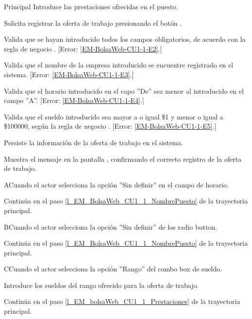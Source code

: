 \begin{UCtrayectoria}{Principal}
		\UCpaso [\UCactor] Introduce las prestaciones ofrecidas en el puesto. \label{l_EM_bolsaWeb_CU1_1_Prestaciones}
 
		\UCpaso [\UCactor] Solicita registrar la oferta de trabajo presionando el botón .

		\UCpaso Valida que se hayan introducido todos los campos obligatorios, de acuerdo con la regla de negocio . [Error: \ref{EM-BolsaWeb-CU1-1-E2}.]

		\UCpaso Valida que el nombre de la empresa introducido se encuentre registrado en el sistema. [Error: \ref{EM-BolsaWeb-CU1-1-E3}.]

		\UCpaso Valida que el horario introducido en el capo ''De'' sea menor al introducido en el campo ''A''. [Error: \ref{EM-BolsaWeb-CU1-1-E4}.]

		\UCpaso Valida que el sueldo introducido sea mayor a o igual \$1 y menor o igual a \$100000, según la regla de negocio . [Error: \ref{EM-BolsaWeb-CU1-1-E5}.]

		\UCpaso Persiste la información de la oferta de trabajo en el sistema. 

		\UCpaso Muestra el mensaje  en la pantalla , confirmando el correcto registro de la oferta de trabajo.
		
	\end{UCtrayectoria}

	\begin{UCtrayectoriaA}{A}{Cuando el actor selecciona la opción ''Sin definir'' en el campo de horario.}

		\UCpaso Continúa en el paso \ref{l_EM_BolsaWeb_CU1_1_NombrePuesto} de la trayectoria principal.

	\end{UCtrayectoriaA}

	\begin{UCtrayectoriaA}{B}{Cuando el actor selecciona la opción ''Sin definir'' de los radio button.}

		\UCpaso Continúa en el paso \ref{l_EM_BolsaWeb_CU1_1_NombrePuesto} de la trayectoria principal.

	\end{UCtrayectoriaA}

	\begin{UCtrayectoriaA}{C}{Cuando el actor selecciona la opción ''Rango'' del combo box de sueldo.}

		\UCpaso [\UCactor] Introduce los sueldos del rango ofrecido para la oferta de trabajo.

		\UCpaso Continúa en el paso \ref{l_EM_bolsaWeb_CU1_1_Prestaciones} de la trayectoria principal.

	\end{UCtrayectoriaA}

